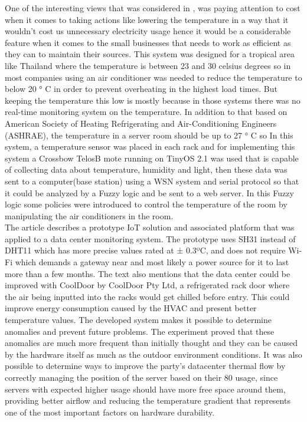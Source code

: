 One of the interesting views that was considered in \cite{choochaisri2011senvm}, was paying attention to cost when it comes to taking actions like lowering the temperature in a way that it wouldn’t cost us unnecessary electricity usage hence it would be a considerable feature when it comes to the small businesses that needs to work as efficient as they can to maintain their sources. This system was designed for a tropical area like Thailand where the temperature is between 23 and 30 celsius degrees so in most companies using an air conditioner was needed to reduce the temperature to below 20 ° C in order to prevent overheating in the highest  load times. But keeping the temperature this low is mostly because in those systems there was no real-time monitoring system on the temperature. In addition to that based on American Society of Heating Refrigerating and Air-Conditioning Engineers (ASHRAE), the temperature in a server room should be up to 27 ° C so In this system, a temperature sensor was placed in each rack and for implementing this system a Crossbow TelosB mote running on TinyOS 2.1 was used that is capable of collecting data about temperature, humidity and light, then these data was sent to a computer(base station) using a WSN system and serial protocol so that it could be analyzed by a Fuzzy logic and be sent to a web server. In this Fuzzy logic some policies were introduced to control the temperature of the room by manipulating the air conditioners in the room.\\
 
The article \cite{santos2019data} describes a prototype IoT solution and associated platform that was applied to a data center monitoring system. The prototype uses SH31 instead of DHT11 which has more precise values rated at ± 0.3ºC, and does not require Wi-Fi which demands a gateway near and most likely a power source for it to last more than a few months. The text also mentions that the data center could be improved with CoolDoor by CoolDoor Pty Ltd, a refrigerated rack door where the air being inputted into the racks would get chilled before entry. This could improve energy consumption caused by the HVAC and present better temperature values. The developed system makes it possible to determine anomalies and prevent future problems. The experiment proved that these anomalies are much more frequent than initially thought and they can be caused by the hardware itself as much as the outdoor environment conditions. It was also possible to determine ways to improve the party’s datacenter thermal flow by correctly managing the position of the server based on their 80 usage, since servers with expected higher usage should have more free space around them, providing better airflow and reducing the temperature gradient that represents one of the most important factors on hardware durability.\\

